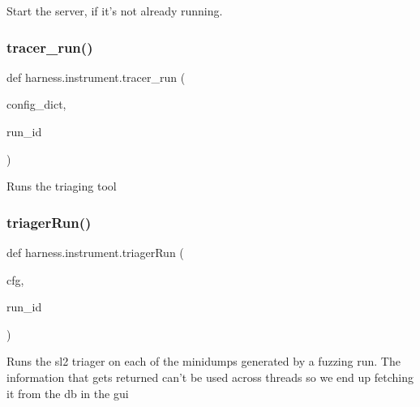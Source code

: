 \begin{DoxyVerb}Start the server, if it's not already running.
\end{DoxyVerb}
 \mbox{\label{namespaceharness_1_1instrument_a2fcc8f7617315b5c4dbefe413d3c49e4}} 
\subsubsection{\texorpdfstring{tracer\+\_\+run()}{tracer\_run()}}
{\footnotesize\ttfamily def harness.\+instrument.\+tracer\+\_\+run (\begin{DoxyParamCaption}\item[{}]{config\+\_\+dict,  }\item[{}]{run\+\_\+id }\end{DoxyParamCaption})}

\begin{DoxyVerb}Runs the triaging tool \end{DoxyVerb}
 \mbox{\label{namespaceharness_1_1instrument_ad576104062a2c6e6f4b91dda2f251ff6}} 
\subsubsection{\texorpdfstring{triager\+Run()}{triagerRun()}}
{\footnotesize\ttfamily def harness.\+instrument.\+triager\+Run (\begin{DoxyParamCaption}\item[{}]{cfg,  }\item[{}]{run\+\_\+id }\end{DoxyParamCaption})}

\begin{DoxyVerb}Runs the sl2 triager on each of the minidumps generated
by a fuzzing run.  The information that gets returned
can't be used across threads so we end up fetching it from the db in the gui
\end{DoxyVerb}
 \mbox{\label{namespaceharness_1_1instrument_ac0548bd2e016703207460bfe843d18a0}} 
